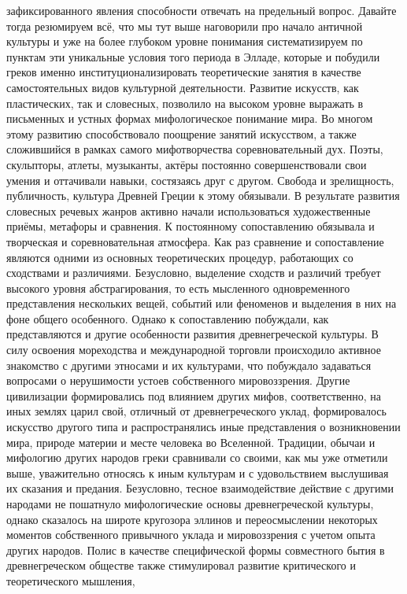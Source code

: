 зафиксированного явления способности отвечать на предельный вопрос. Давайте
тогда резюмируем всё, что мы тут выше наговорили про начало античной культуры и
уже на более глубоком уровне понимания систематизируем по пунктам эти уникальные
условия того периода в Элладе, которые и побудили греков именно
институционализировать теоретические занятия в качестве самостоятельных видов
культурной деятельности. Развитие искусств, как пластических, так и словесных,
позволило на высоком уровне выражать в письменных и устных формах мифологическое
понимание мира. Во многом этому развитию способствовало поощрение занятий
искусством, а также сложившийся в рамках самого мифотворчества соревновательный
дух. Поэты, скульпторы, атлеты, музыканты, актёры постоянно совершенствовали
свои умения и оттачивали навыки, состязаясь друг с другом. Свобода и
зрелищность, публичность, культура Древней Греции к этому обязывали. В
результате развития словесных речевых жанров активно начали использоваться
художественные приёмы, метафоры и сравнения. К постоянному сопоставлению
обязывала и творческая и соревновательная атмосфера. Как раз сравнение и
сопоставление являются одними из основных теоретических процедур, работающих со
сходствами и различиями. Безусловно, выделение сходств и различий требует
высокого уровня абстрагирования, то есть мысленного одновременного представления
нескольких вещей, событий или феноменов и выделения в них на фоне общего
особенного. Однако к сопоставлению побуждали, как представляются и другие
особенности развития древнегреческой культуры. В силу освоения мореходства и
международной торговли происходило активное знакомство с другими этносами и их
культурами, что побуждало задаваться вопросами о нерушимости устоев собственного
мировоззрения. Другие цивилизации формировались под влиянием других мифов,
соответственно, на иных землях царил свой, отличный от древнегреческого уклад,
формировалось искусство другого типа и распространялись иные представления о
возникновении мира, природе материи и месте человека во Вселенной. Традиции,
обычаи и мифологию других народов греки сравнивали со своими, как мы уже
отметили выше, уважительно относясь к иным культурам и с удовольствием
выслушивая их сказания и предания. Безусловно, тесное взаимодействие действие с
другими народами не пошатнуло мифологические основы древнегреческой культуры,
однако сказалось на широте кругозора эллинов и переосмыслении некоторых моментов
собственного привычного уклада и мировоззрения с учетом опыта других народов.
Полис в качестве специфической формы совместного бытия в древнегреческом
обществе также стимулировал развитие критического и теоретического мышления,
